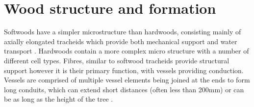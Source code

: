 \section{Wood structure and formation}
Softwoods have a simpler microstructure than hardwoods, consisting mainly of
axially elongated tracheids which provide both mechanical support and water
transport \cite{bowyer2007forest}. Hardwoods contain a more complex micro structure with a number
of different cell types. Fibres, similar to softwood tracheids provide
structural support however it is their primary function, with vessels providing
conduction. Vessels are comprised of
multiple vessel elements being joined at the ends to form long conduits, which
can extend short distances (often less than 200mm) or can be as long as the
height of the tree \cite{walker1993primary}.